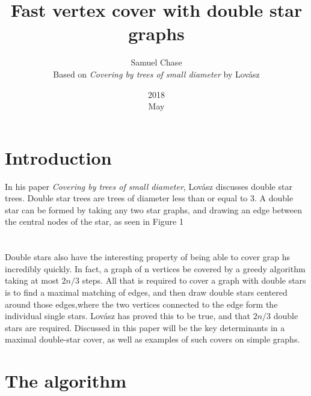 \documentclass{article}
\title{Fast vertex cover with double star graphs}
\date{2018\\ May}
\author{Samuel Chase\\ Based on \textit{Covering by trees of small diameter} by Lov\'asz}
\begin{document}
	\maketitle
	\section{Introduction}
	In his paper \textit{Covering by trees of small diameter}, Lov\'asz discusses double star trees. Double star trees are trees of diameter less than or equal to 3. A double star can be formed by taking any two star graphs, and drawing an edge between the central nodes of the star, as seen in Figure 1
	\\\\\\
	Double stars also have the interesting property of being able to cover grap hs incredibly quickly. In fact, a graph of n vertices be covered by a greedy algorithm taking at most $2n/3$ steps. All that is required to cover a graph with double stars is to find a maximal matching of edges, and then draw double stars centered around those edges,where the two vertices connected to the edge form the individual single stars. Lov\'asz has proved this to be true, and that $2n/3$ double stars are required. Discussed in this paper will be the key determinants in a maximal double-star cover, as well as examples of such covers on simple graphs.
	\section{The algorithm}
\end{document}

